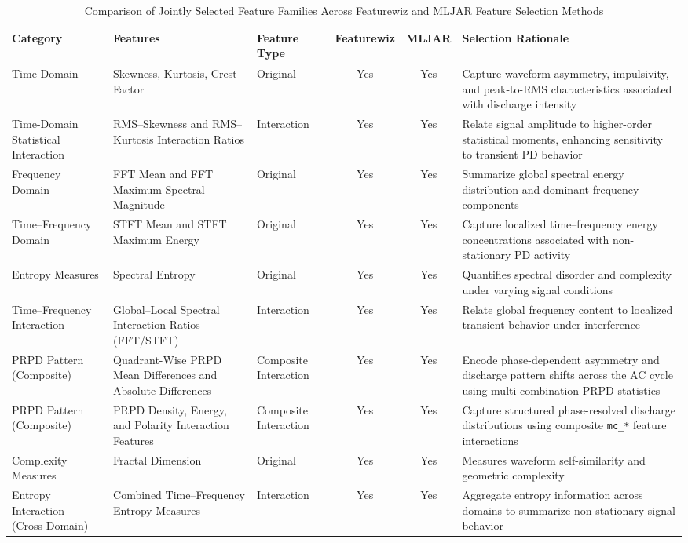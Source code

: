 \begin{table}
\centering
\caption{Comparison of Jointly Selected Feature Families Across Featurewiz and MLJAR Feature Selection Methods}
\label{tab:fs_comparison_outcomes}
\footnotesize
\renewcommand{\arraystretch}{1.15}
\setlength{\tabcolsep}{6pt}
\begin{tabular}{|l|p{5cm}|l|c|c|p{5cm}|}
\hline
\textbf{Category} & \textbf{Features} & \textbf{Feature Type} & \textbf{Featurewiz} & \textbf{MLJAR} & \textbf{Selection Rationale} \\
\hline
Time Domain &
Skewness, Kurtosis, Crest Factor &
Original &
Yes &
Yes &
Capture waveform asymmetry, impulsivity, and peak-to-RMS characteristics associated with discharge intensity \\
\hline
Time-Domain Statistical Interaction &
RMS--Skewness and RMS--Kurtosis Interaction Ratios &
Interaction &
Yes &
Yes &
Relate signal amplitude to higher-order statistical moments, enhancing sensitivity to transient PD behavior \\
\hline
Frequency Domain &
FFT Mean and FFT Maximum Spectral Magnitude &
Original &
Yes &
Yes &
Summarize global spectral energy distribution and dominant frequency components \\
\hline
Time--Frequency Domain &
STFT Mean and STFT Maximum Energy &
Original &
Yes &
Yes &
Capture localized time--frequency energy concentrations associated with non-stationary PD activity \\
\hline
Entropy Measures &
Spectral Entropy &
Original &
Yes &
Yes &
Quantifies spectral disorder and complexity under varying signal conditions \\
\hline
Time--Frequency Interaction &
Global--Local Spectral Interaction Ratios (FFT/STFT) &
Interaction &
Yes &
Yes &
Relate global frequency content to localized transient behavior under interference \\
\hline
PRPD Pattern (Composite) &
Quadrant-Wise PRPD Mean Differences and Absolute Differences &
Composite Interaction &
Yes &
Yes &
Encode phase-dependent asymmetry and discharge pattern shifts across the AC cycle using multi-combination PRPD statistics \\
\hline
PRPD Pattern (Composite) &
PRPD Density, Energy, and Polarity Interaction Features &
Composite Interaction &
Yes &
Yes &
Capture structured phase-resolved discharge distributions using composite \texttt{mc\_*} feature interactions \\
\hline
Complexity Measures &
Fractal Dimension &
Original &
Yes &
Yes &
Measures waveform self-similarity and geometric complexity \\
\hline
Entropy Interaction (Cross-Domain) &
Combined Time--Frequency Entropy Measures &
Interaction &
Yes &
Yes &
Aggregate entropy information across domains to summarize non-stationary signal behavior \\
\hline
\end{tabular}
\end{table}

